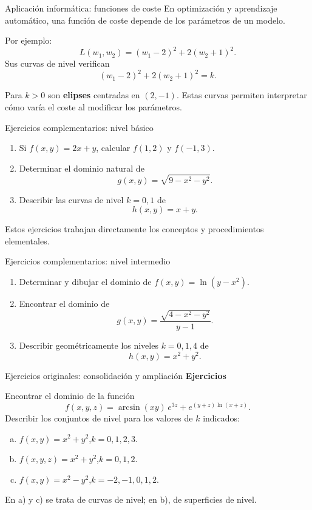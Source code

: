 \documentclass[main.tex]{subfiles}
\begin{document}
\begin{frame}{Aplicación informática: funciones de coste}
En optimización y aprendizaje automático, una función de coste depende de los parámetros de un modelo.
\medskip

Por ejemplo:
\[
L(w_1,w_2)=(w_1-2)^2+2(w_2+1)^2.
\]
Sus curvas de nivel verifican
\[
(w_1-2)^2+2(w_2+1)^2=k.
\]
\medskip

Para $k>0$ son \textbf{elipses} centradas en $(2,-1)$.
Estas curvas permiten interpretar cómo varía el coste al modificar los parámetros.
\end{frame}

\begin{frame}{Ejercicios complementarios: nivel básico}
\begin{enumerate}
\item Si $f(x,y)=2x+y$, calcular $f(1,2)$ y $f(-1,3)$.
\medskip
\item Determinar el dominio natural de
\[
g(x,y)=\sqrt{9-x^2-y^2}.
\]
\item Describir las curvas de nivel $k=0,1$ de
\[
h(x,y)=x+y.
\]
\end{enumerate}
\medskip
\small Estos ejercicios trabajan directamente los conceptos y procedimientos elementales.
\end{frame}

\begin{frame}{Ejercicios complementarios: nivel intermedio}
\begin{enumerate}
\item Determinar y dibujar el dominio de $f(x,y)=\ln(y-x^2)$.
\medskip
\item Encontrar el dominio de
\[
g(x,y)=\frac{\sqrt{4-x^2-y^2}}{y-1}.
\]
\item Describir geométricamente los niveles $k=0,1,4$ de
\[
h(x,y)=x^2+y^2.
\]
\end{enumerate}
\end{frame}

\begin{frame}{Ejercicios originales: consolidación y ampliación}
\small\textbf{Ejercicios}
\medskip

Encontrar el dominio de la función
\[f(x,y,z)=\arcsin(xy)\,e^{3z}+e^{(y+z)\ln(x+z)}.\]
Describir los conjuntos de nivel para los valores de $k$ indicados:
\begin{enumerate}[a)]
\item $f(x,y)=x^2+y^2$,\quad $k=0,1,2,3$.
\item $f(x,y,z)=x^2+y^2$,\quad $k=0,1,2$.
\item $f(x,y)=x^2-y^2$,\quad $k=-2,-1,0,1,2$.
\end{enumerate}
En a) y c) se trata de curvas de nivel; en b), de superficies de nivel.
\end{frame}
\end{document}
